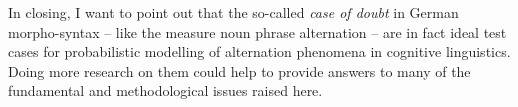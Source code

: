 In closing, I want to point out that the so-called \textit{case of doubt} in German morpho-syntax -- like the measure noun phrase alternation -- are in fact ideal test cases for probabilistic modelling of alternation phenomena in cognitive linguistics.
Doing more research on them could help to provide answers to many of the fundamental and methodological issues raised here.
